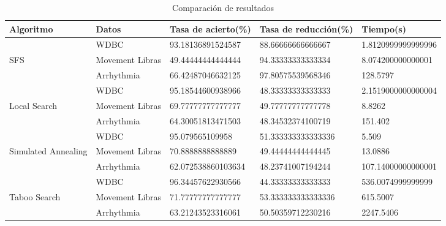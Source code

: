 \begin{table}[H]
	\centering
	\caption{Comparación de resultados}
	\label{Compare}
	\begin{tabular}{l|l|lll}
		Algoritmo 			& Datos				& Tasa de acierto(\%) & Tasa de reducción(\%) & Tiempo(s)			\\ \hline
							& WDBC				& 93.18136891524587   & 88.66666666666667     & 1.8120999999999996	\\ \cline{2-5}
		SFS					& Movement Libras	& 49.44444444444444   & 94.33333333333334     & 8.074200000000001	\\ \cline{2-5}
							& Arrhythmia		& 66.42487046632125   & 97.80575539568346     & 128.5797 			\\ \hline
							& WDBC				& 95.18544600938966   & 48.33333333333333     & 2.1519000000000004	\\ \cline{2-5}
		Local Search    	& Movement Libras	& 69.77777777777777   & 49.77777777777778     & 8.8262   			\\ \cline{2-5}
							& Arrhythmia		& 64.30051813471503   & 48.34532374100719     & 151.402  			\\ \hline
							& WDBC				& 95.079565109958     & 51.333333333333336    & 5.509    			\\ \cline{2-5}
		Simulated Annealing	& Movement Libras	& 70.8888888888889    & 49.44444444444445     & 13.0886  			\\ \cline{2-5}
							& Arrhythmia		& 62.072538860103634  & 48.23741007194244     & 107.14000000000001	\\ \hline
			            	& WDBC				& 96.34457622930566   & 44.33333333333333     & 536.0074999999999	\\ \cline{2-5}
		Taboo Search		& Movement Libras	& 71.77777777777777   & 53.333333333333336    & 615.5007 			\\ \cline{2-5}
							& Arrhythmia		& 63.21243523316061   & 50.50359712230216     & 2247.5406
		
	\end{tabular}
\end{table}
